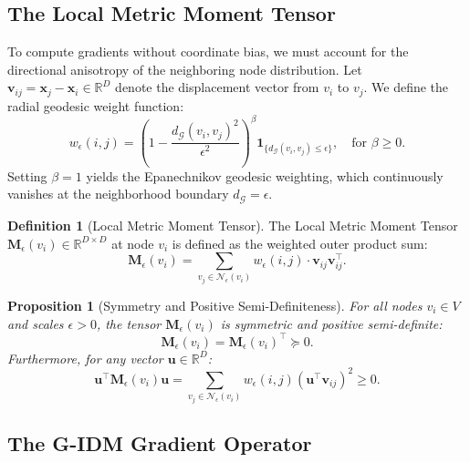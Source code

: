 \documentclass[11pt,a4paper]{article}
\newtheorem{proposition}[theorem]{Proposition}
\theoremstyle{definition}
\newtheorem{definition}{Definition}
\begin{document}
\subsection{The Local Metric Moment Tensor}
To compute gradients without coordinate bias, we must account for the directional anisotropy of the neighboring node distribution.
Let $\mathbf{v}_{ij} = \mathbf{x}_j - \mathbf{x}_i \in \mathbb{R}^D$ denote the displacement vector from $v_i$ to $v_j$. We define the radial geodesic weight function:
\begin{equation}
w_\epsilon(i, j) = \left( 1 - \frac{d_{\mathcal{G}}(v_i, v_j)^2}{\epsilon^2} \right)^\beta \mathbf{1}_{\{d_{\mathcal{G}}(v_i, v_j) \le \epsilon\}}, \quad \text{for } \beta \ge 0.
\label{eq:geodesic_weights}
\end{equation}
Setting $\beta = 1$ yields the Epanechnikov geodesic weighting, which continuously vanishes at the neighborhood boundary $d_{\mathcal{G}} = \epsilon$.

\begin{definition}[Local Metric Moment Tensor]
The Local Metric Moment Tensor $\mathbf{M}_\epsilon(v_i) \in \mathbb{R}^{D \times D}$ at node $v_i$ is defined as the weighted outer product sum:
\begin{equation}
\mathbf{M}_\epsilon(v_i) = \sum_{v_j \in \mathcal{N}_\epsilon(v_i)} w_\epsilon(i, j) \cdot \mathbf{v}_{ij} \mathbf{v}_{ij}^\top.
\label{eq:moment_tensor_def}
\end{equation}
\end{definition}

\begin{proposition}[Symmetry and Positive Semi-Definiteness]
For all nodes $v_i \in V$ and scales $\epsilon > 0$, the tensor $\mathbf{M}_\epsilon(v_i)$ is symmetric and positive semi-definite:
\begin{equation}
\mathbf{M}_\epsilon(v_i) = \mathbf{M}_\epsilon(v_i)^\top \succeq 0.
\end{equation}
Furthermore, for any vector $\mathbf{u} \in \mathbb{R}^D$:
\begin{equation}
\mathbf{u}^\top \mathbf{M}_\epsilon(v_i) \mathbf{u} = \sum_{v_j \in \mathcal{N}_\epsilon(v_i)} w_\epsilon(i, j) \left( \mathbf{u}^\top \mathbf{v}_{ij} \right)^2 \ge 0.
\end{equation}
\end{proposition}

\subsection{The G-IDM Gradient Operator}
\end{document}
